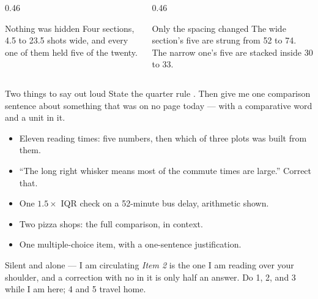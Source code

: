\documentclass[aspectratio=169, 11pt]{beamer}
\begin{document}
\begin{frame}[t, plain]
  \vspace{6pt}
  \begin{columns}[t]
    \begin{column}{0.46\textwidth}
      \begin{block}{Nothing was hidden}
        Four sections, 4.5 to 23.5 shots wide, and every one of them held five of the twenty.
      \end{block}
    \end{column}
    \begin{column}{0.46\textwidth}
      \begin{block}{Only the spacing changed}
        The wide section's five are strung from 52 to 74. The narrow one's five are stacked
        inside 30 to 33.
      \end{block}
    \end{column}
  \end{columns}
  \vspace{12pt}
  \begin{block}{Two things to say out loud}
    State the quarter rule . Then give me one comparison
    sentence about something that was on no page today --- with a comparative word and a unit in
    it.
  \end{block}
\end{frame}

\begin{frame}[t, plain]
  \begin{itemize}\setlength{\itemsep}{5pt}
    \item Eleven reading times: five numbers, then which of three plots was built from them.
    \item ``The long right whisker means most of the commute times are large.'' Correct that.
    \item One $1.5 \times$ IQR check on a 52-minute bus delay, arithmetic shown.
    \item Two pizza shops: the full comparison, in context.
    \item One multiple-choice item, with a one-sentence justification.
  \end{itemize}
  \begin{block}{Silent and alone --- I am circulating}
    \emph{Item 2} is the one I am reading over your shoulder, and a correction with no
     in it is only half an answer. Do 1, 2, and 3 while I am here; 4 and 5 travel
    home.
  \end{block}
\end{frame}
\end{document}
